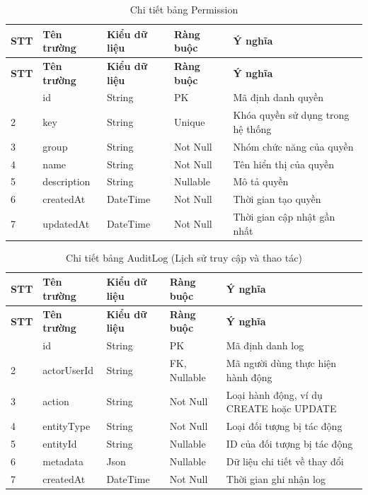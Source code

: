 \begin{longtable}{|p{0.7cm}|p{3.3cm}|p{1.9cm}|p{2.1cm}|p{5.4cm}|}
    \caption{Chi tiết bảng Permission}
    \label{tab:db_permission} \\
    \hline
    \textbf{STT} & \textbf{Tên trường} & \textbf{Kiểu dữ liệu} & \textbf{Ràng buộc} & \textbf{Ý nghĩa} \\
    \hline
    \endfirsthead
    \hline
    \textbf{STT} & \textbf{Tên trường} & \textbf{Kiểu dữ liệu} & \textbf{Ràng buộc} & \textbf{Ý nghĩa} \\
    \hline
    \endhead
    \hline
    \endfoot
    \hline
    \endlastfoot
    1 & id & String & PK & Mã định danh quyền \\ \hline
    2 & key & String & Unique & Khóa quyền sử dụng trong hệ thống \\ \hline
    3 & group & String & Not Null & Nhóm chức năng của quyền \\ \hline
    4 & name & String & Not Null & Tên hiển thị của quyền \\ \hline
    5 & description & String & Nullable & Mô tả quyền \\ \hline
    6 & createdAt & DateTime & Not Null & Thời gian tạo quyền \\ \hline
    7 & updatedAt & DateTime & Not Null & Thời gian cập nhật gần nhất \\
\end{longtable}

\begin{longtable}{|p{0.7cm}|p{3.3cm}|p{1.9cm}|p{2.1cm}|p{5.4cm}|}
    \caption{Chi tiết bảng AuditLog (Lịch sử truy cập và thao tác)}
    \label{tab:db_auditlog} \\
    \hline
    \textbf{STT} & \textbf{Tên trường} & \textbf{Kiểu dữ liệu} & \textbf{Ràng buộc} & \textbf{Ý nghĩa} \\
    \hline
    \endfirsthead
    \hline
    \textbf{STT} & \textbf{Tên trường} & \textbf{Kiểu dữ liệu} & \textbf{Ràng buộc} & \textbf{Ý nghĩa} \\
    \hline
    \endhead
    \hline
    \endfoot
    \hline
    \endlastfoot
    1 & id & String & PK & Mã định danh log \\ \hline
    2 & actorUserId & String & FK, Nullable & Mã người dùng thực hiện hành động \\ \hline
    3 & action & String & Not Null & Loại hành động, ví dụ CREATE hoặc UPDATE \\ \hline
    4 & entityType & String & Not Null & Loại đối tượng bị tác động \\ \hline
    5 & entityId & String & Nullable & ID của đối tượng bị tác động \\ \hline
    6 & metadata & Json & Nullable & Dữ liệu chi tiết về thay đổi \\ \hline
    7 & createdAt & DateTime & Not Null & Thời gian ghi nhận log \\
\end{longtable}

